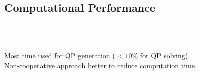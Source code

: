 \subsection{Computational Performance}
\begin{frame}{~}
  \vspace{-3em}
  \begin{center}
    \resizebox{!}{0.35\textheight}{
      \begin{minipage}{\linewidth}
        \begin{minipage}{\linewidth}
          
        \end{minipage}
        \\
        \begin{minipage}{\linewidth}
          
        \end{minipage}
      \end{minipage}
    }
    \resizebox{!}{0.35\textheight}{
      \begin{minipage}{\linewidth}
        \begin{minipage}{\linewidth}
          
        \end{minipage}
        \\
        \begin{minipage}{\linewidth}
          
        \end{minipage}
      \end{minipage}
    }
    \\
    Most time used for QP generation ($< 10\%$ for QP solving)\\
    \alert{Non-cooperative approach better to reduce computation time}\\
  \end{center}

\end{frame}



